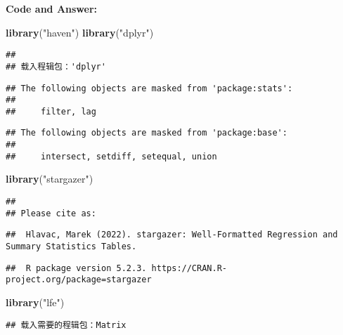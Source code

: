 \documentclass[
]{article}
\newenvironment{Shaded}{\begin{snugshade}}{\end{snugshade}}
\newcommand{\FunctionTok}[1]{\textcolor[rgb]{0.13,0.29,0.53}{\textbf{#1}}}
\newcommand{\NormalTok}[1]{#1}
\newcommand{\StringTok}[1]{\textcolor[rgb]{0.31,0.60,0.02}{#1}}
\begin{document}
\textbf{Code and Answer:}

\begin{Shaded}
\begin{Highlighting}[]
\FunctionTok{library}\NormalTok{(}\StringTok{"haven"}\NormalTok{)}
\FunctionTok{library}\NormalTok{(}\StringTok{"dplyr"}\NormalTok{)}
\end{Highlighting}
\end{Shaded}

\begin{verbatim}
## 
## 载入程辑包：'dplyr'
\end{verbatim}

\begin{verbatim}
## The following objects are masked from 'package:stats':
## 
##     filter, lag
\end{verbatim}

\begin{verbatim}
## The following objects are masked from 'package:base':
## 
##     intersect, setdiff, setequal, union
\end{verbatim}

\begin{Shaded}
\begin{Highlighting}[]
\FunctionTok{library}\NormalTok{(}\StringTok{"stargazer"}\NormalTok{)}
\end{Highlighting}
\end{Shaded}

\begin{verbatim}
## 
## Please cite as:
\end{verbatim}

\begin{verbatim}
##  Hlavac, Marek (2022). stargazer: Well-Formatted Regression and Summary Statistics Tables.
\end{verbatim}

\begin{verbatim}
##  R package version 5.2.3. https://CRAN.R-project.org/package=stargazer
\end{verbatim}

\begin{Shaded}
\begin{Highlighting}[]
\FunctionTok{library}\NormalTok{(}\StringTok{"lfe"}\NormalTok{)}
\end{Highlighting}
\end{Shaded}

\begin{verbatim}
## 载入需要的程辑包：Matrix
\end{verbatim}
\end{document}
